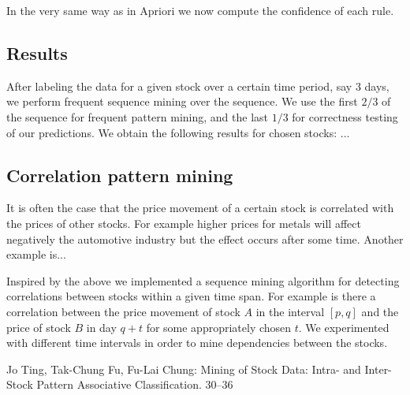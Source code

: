 \documentclass{llncs}
\begin{document}
\begin{enumerate}
In the very same way as in Apriori we now compute the confidence of each rule.

\subsection*{Results} After labeling the data for a given stock over a certain time period, say 3 days, we perform frequent sequence mining over the sequence. We use the first $2/3$ of the sequence for frequent pattern mining, and the last $1/3$ for correctness testing of our predictions. We obtain the following results for chosen stocks:
...
\subsection*{Correlation pattern mining}
It is often the case that the price movement of a certain stock is correlated with the prices of other stocks. For example higher prices for metals will affect negatively the automotive industry but the effect occurs after some time. Another example is...

Inspired by the above we implemented a sequence mining algorithm for detecting correlations between stocks within a given time span. For example is there a correlation between the price movement of stock $A$ in the interval $[p, q]$ and the price of stock $B$ in day $q+t$ for some appropriately chosen $t$. We experimented with different time intervals in order to mine dependencies between the stocks.
\end{enumerate}
\begin{thebibliography}{1}
Jo Ting, Tak-Chung Fu, Fu-Lai Chung: 
\newblock Mining of Stock Data: Intra- and Inter-Stock Pattern Associative Classification.  30--36
\end{thebibliography}
\end{document}
